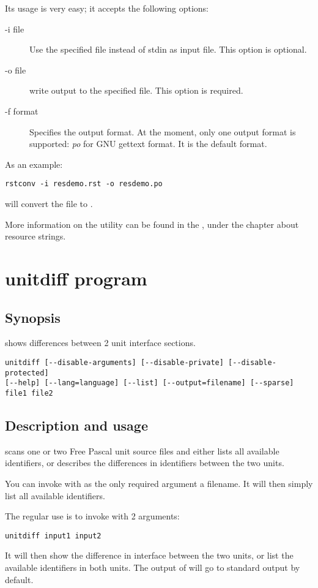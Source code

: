 Its usage is very easy; it accepts the following options:
\begin{description}
\item[-i file] Use the specified file instead of stdin as input file. This
option is optional.
\item[-o file] write output to the specified file. This option is required.
\item[-f format] Specifies the output format. At the moment, only one output
format is supported: {\em po} for GNU gettext  format.
It is the default format.
\end{description}
As an example:
\begin{verbatim}
rstconv -i resdemo.rst -o resdemo.po
\end{verbatim}
will convert the  file to .

More information on the  utility can be found in the \progref,
under the chapter about resource strings.

\section{unitdiff program}

\subsection{Synopsis}
 shows differences between 2 unit interface sections. 
\begin{verbatim}
unitdiff [--disable-arguments] [--disable-private] [--disable-protected] 
[--help] [--lang=language] [--list] [--output=filename] [--sparse] 
file1 file2
\end{verbatim}

\subsection{Description and usage}

 scans one or two Free Pascal unit source files and either lists all
available identifiers, or describes the differences in identifiers
between the two units.

You can invoke  with as the only required argument a
 filename. It will then simply list all available identifiers.

The regular use is to invoke  with 2 arguments:
\begin{verbatim}
unitdiff input1 input2
\end{verbatim}
It will then show the difference in interface between the two
units, or list the available identifiers in both units. The output of 
 will go to standard output by default.

